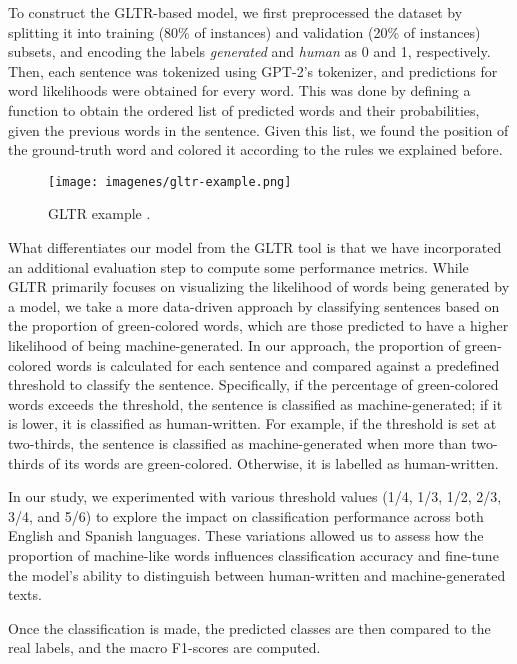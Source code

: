 \documentclass[a4paper,11pt,twocolumn,twoside]{article}
\begin{document}
To construct the GLTR-based model, we first preprocessed the dataset by splitting it into training (80\% of instances) and validation (20\% of instances) subsets, and encoding the labels \textit{generated} and \textit{human} as 0 and 1, respectively. Then, each sentence was tokenized using GPT-2's tokenizer, and predictions for word likelihoods were obtained for every word. This was done by defining a function to obtain the ordered list of predicted words and their probabilities, given the previous words in the sentence. Given this list, we found the position of the ground-truth word and colored it according to the rules we explained before.
\begin{figure} 
    \centering
    \texttt{[image: imagenes/gltr-example.png]}
    \caption{\centering GLTR example \cite{DBLP:journals/corr/abs-1906-04043}.}
    \label{fig:gltr-example}
\end{figure}

What differentiates our model from the GLTR tool is that we have incorporated an additional evaluation step to compute some performance metrics. While GLTR primarily focuses on visualizing the likelihood of words being generated by a model, we take a more data-driven approach by classifying sentences based on the proportion of green-colored words, which are those predicted to have a higher likelihood of being machine-generated.
In our approach, the proportion of green-colored words is calculated for each sentence and compared against a predefined threshold to classify the sentence. Specifically, if the percentage of green-colored words exceeds the threshold, the sentence is classified as machine-generated; if it is lower, it is classified as human-written.
For example, if the threshold is set at two-thirds, the sentence is classified as machine-generated when more than two-thirds of its words are green-colored. Otherwise, it is labelled as human-written.

In our study, we experimented with various threshold values (1/4, 1/3, 1/2, 2/3, 3/4, and 5/6) to explore the impact on classification performance across both English and Spanish languages. These variations allowed us to assess how the proportion of machine-like words influences classification accuracy and fine-tune the model's ability to distinguish between human-written and machine-generated texts.

Once the classification is made, the predicted classes are then compared to the real labels, and the macro F1-scores are computed.
\end{document}

